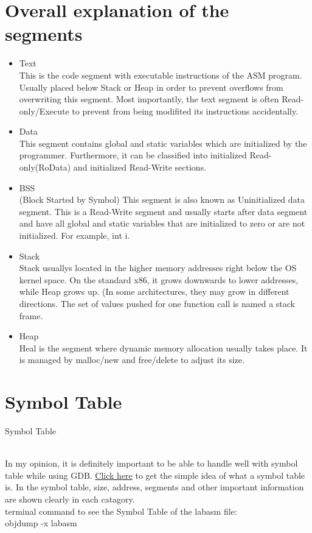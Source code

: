 \documentclass{article}
\begin{document}
\section*{Overall explanation of the segments}
\begin{itemize}
\item
Text\\
This is the code segment with executable instructions of the ASM program. Usually placed below Stack or Heap in order to prevent overflows from overwriting this segment. Most importantly, the text segment is often Read-only/Execute to prevent from being modifited its instructions accidentally.
\item
Data\\
This segment contains global and static variables which are initialized by the programmer. Furthermore, it can be classified into initialized Read-only(RoData) and initialized Read-Write sections. 
\item
BSS\\
(Block Started by Symbol) This segment is also known as Uninitialized data segment. This is a Read-Write segment and usually starts after data segment and have all global and static variables that are initialized to zero or are not initialized. For example, int i.
\item
Stack\\
Stack usuallys located in the higher memory addresses right below the OS kernel space. On the standard x86, it grows downwards to lower addresses, while Heap grows up. (In some architectures, they may grow in different directions. The set of values pushed for one function call is named a stack frame.
\item
Heap\\
Heal is the segment where dynamic memory allocation usually takes place. It is managed by malloc/new and free/delete to adjust its size.
\end{itemize}
\clearpage


\section*{Symbol Table}
\hypertarget{st}{Symbol Table} \\
In my opinion, it is definitely important to be able to handle well with symbol table while using GDB. \href{http://goo.gl/ygJ29f}{Click here} to get the simple idea of what a symbol table is. In the symbol table, size, address, segments and other important information are shown clearly in each catagory. \\
terminal command to see the Symbol Table of the labasm file: \\
objdump -x labasm \\
\end{document}
